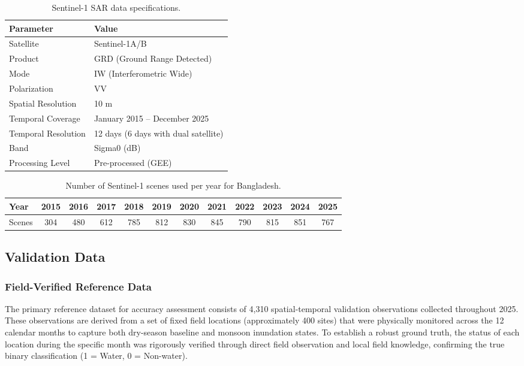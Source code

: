 \documentclass[fleqn,10pt]{article}
\begin{document}
\begin{table}[H]
\centering
\caption{Sentinel-1 SAR data specifications.}
\label{tab:s1_specs}
\begin{tabular}{ll}
\toprule
\textbf{Parameter} & \textbf{Value} \\
\midrule
Satellite & Sentinel-1A/B \\
Product & GRD (Ground Range Detected) \\
Mode & IW (Interferometric Wide) \\
Polarization & VV \\
Spatial Resolution & 10 m \\
Temporal Coverage & January 2015 -- December 2025 \\
Temporal Resolution & 12 days (6 days with dual satellite) \\
Band & Sigma0 (dB) \\
Processing Level & Pre-processed (GEE) \\
\bottomrule
\end{tabular}
\end{table}

\begin{table}[H]
\centering
\caption{Number of Sentinel-1 scenes used per year for Bangladesh.}
\label{tab:s1_count}
\begin{tabular}{lccccccccccc}
\toprule
\textbf{Year} & 2015 & 2016 & 2017 & 2018 & 2019 & 2020 & 2021 & 2022 & 2023 & 2024 & 2025 \\
\midrule
Scenes & 304 & 480 & 612 & 785 & 812 & 830 & 845 & 790 & 815 & 851 & 767 \\
\bottomrule
\end{tabular}
\end{table}

\subsection{Validation Data}

\subsubsection{Field-Verified Reference Data}
The primary reference dataset for accuracy assessment consists of 4,310 spatial-temporal validation observations collected throughout 2025. These observations are derived from a set of fixed field locations (approximately 400 sites) that were physically monitored across the 12 calendar months to capture both dry-season baseline and monsoon inundation states. To establish a robust ground truth, the status of each location during the specific month was rigorously verified through direct field observation and local field knowledge, confirming the true binary classification (1 = Water, 0 = Non-water).
\end{document}
